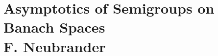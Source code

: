 
\chapter{Asymptotics of Semigroups on Banach Spaces \\
\large{F. Neubrander}}\label{chap:A-IV}

%
%
%
%
%
